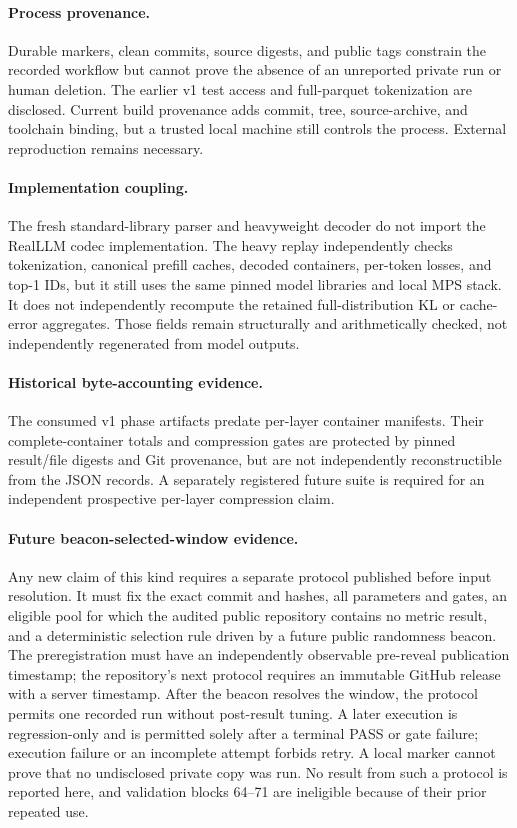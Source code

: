 \documentclass[10pt,twocolumn]{article}
\begin{document}
\paragraph{Process provenance.}
Durable markers, clean commits, source digests, and public tags constrain the
recorded workflow but cannot prove the absence of an unreported private run or
human deletion. The earlier v1 test access and full-parquet tokenization are
disclosed. Current build provenance adds commit, tree, source-archive, and
toolchain binding, but a trusted local machine still controls the process.
External reproduction remains necessary.

\paragraph{Implementation coupling.}
The fresh standard-library parser and heavyweight decoder do not import the
RealLLM codec implementation. The heavy replay independently checks
tokenization, canonical prefill caches, decoded containers, per-token losses,
and top-1 IDs, but it still uses the same pinned model libraries and local MPS
stack. It does not independently recompute the retained full-distribution KL or
cache-error aggregates. Those fields remain structurally and arithmetically
checked, not independently regenerated from model outputs.

\paragraph{Historical byte-accounting evidence.}
The consumed v1 phase artifacts predate per-layer container manifests.
Their complete-container totals and compression gates are protected by pinned
result/file digests and Git provenance, but are not independently
reconstructible from the JSON records. A separately registered future suite is
required for an independent prospective per-layer compression claim.

\paragraph{Future beacon-selected-window evidence.}
Any new claim of this kind requires a separate protocol published before input
resolution. It must fix the exact commit and hashes, all parameters and gates,
an eligible pool for which the audited public repository contains no metric
result, and a deterministic selection rule driven by a future public randomness
beacon. The preregistration must have
an independently observable pre-reveal publication timestamp; the repository's
next protocol requires an immutable GitHub release with a server timestamp.
After the beacon resolves the window, the protocol permits one recorded run
without post-result tuning. A later execution is regression-only and is
permitted solely after a terminal PASS or gate failure; execution failure or an
incomplete attempt forbids retry. A local marker cannot prove that no
undisclosed private copy was run. No result from such a protocol is reported
here, and validation blocks 64--71 are ineligible because of their prior
repeated use.
\end{document}
